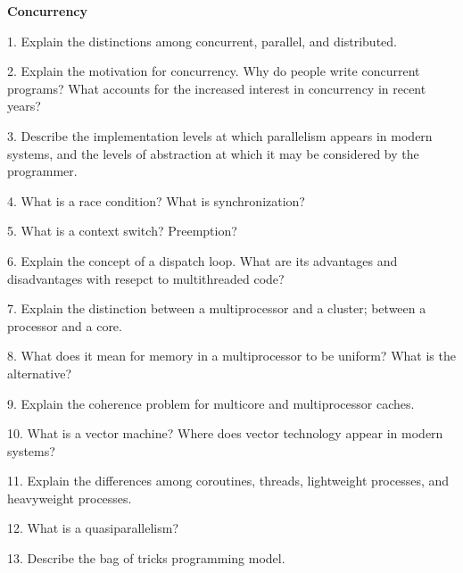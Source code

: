 \centerline{\bf Concurrency}

\vskip 1cm

1. Explain the distinctions among concurrent, parallel, and distributed.

\filbreak
\vskip 1cm

2. Explain the motivation for concurrency. Why do people write concurrent programs? What accounts for the increased interest in concurrency in recent years?

\filbreak
\vskip 1cm

3. Describe the implementation levels at which parallelism appears in modern systems, and the levels of abstraction at which it may be considered by the programmer.

\filbreak
\vskip 1cm

4. What is a race condition? What is synchronization?

\filbreak
\vskip 1cm

5. What is a context switch? Preemption?

\filbreak
\vskip 1cm

6. Explain the concept of a dispatch loop. What are its advantages and disadvantages with resepct to multithreaded code?

\filbreak
\vskip 1cm

7. Explain the distinction between a multiprocessor and a cluster; between a processor and a core.

\filbreak
\vskip 1cm

8. What does it mean for memory in a multiprocessor to be uniform? What is the alternative?

\filbreak
\vskip 1cm

9. Explain the coherence problem for multicore and multiprocessor caches.

\filbreak
\vskip 1cm

10. What is a vector machine? Where does vector technology appear in modern systems?

\filbreak
\vskip 1cm

11. Explain the differences among coroutines, threads, lightweight processes, and heavyweight processes.

\filbreak
\vskip 1cm

12. What is a quasiparallelism?

\filbreak
\vskip 1cm

13. Describe the bag of tricks programming model.

\filbreak
\vskip 1cm

